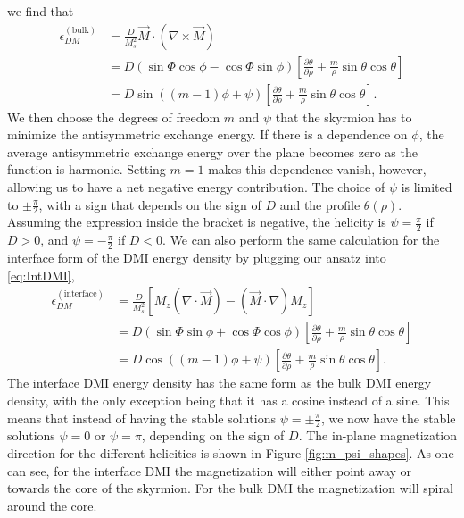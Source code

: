 \documentclass[12pt, a4paper, twoside, openright]{article}		%
\numberwithin{equation}{section}
\begin{document}
we find that
\begin{align}
\nonumber \epsilon_{DM}^{(\text{bulk})} &= \frac{D}{M_s^2} \vec{M}\cdot(\nabla\times\vec{M}) \\
\nonumber &= D\left(\sin\Phi\cos\phi-\cos\Phi\sin\phi\right)\left[\frac{\partial\theta}{\partial\rho}+\frac{m}{\rho}\sin\theta\cos\theta\right] \\
&= D\sin((m-1)\phi+\psi)\left[\frac{\partial\theta}{\partial\rho}+\frac{m}{\rho}\sin\theta\cos\theta\right].\label{eq:BulkDMIepsilon}
\end{align}
We then choose the degrees of freedom $m$ and $\psi$ that the skyrmion has to minimize the antisymmetric exchange energy. If there is a dependence on $\phi$, the average antisymmetric exchange energy over the plane becomes zero as the function is harmonic. Setting $m=1$ makes this dependence vanish, however, allowing us to have a net negative energy contribution. The choice of $\psi$ is limited to $\pm \frac{\pi}{2}$, with a sign that depends on the sign of $D$ and the profile $\theta(\rho)$. Assuming the expression inside the bracket is negative, the helicity is $\psi = \frac{\pi}{2}$ if $D>0$, and $\psi = -\frac{\pi}{2}$ if $D<0$. We can also perform the same calculation for the interface form of the DMI energy density by plugging our ansatz into \eqref{eq:IntDMI},
\begin{align}
\nonumber \epsilon_{DM}^{(\text{interface})} &= \frac{D}{M_s^2}\left[ M_z (\nabla\cdot\vec{M}) - (\vec{M}\cdot\nabla)M_z\right] \\
\nonumber &= D\left(\sin\Phi\sin\phi+\cos\Phi\cos\phi\right)\left[\frac{\partial\theta}{\partial\rho}+\frac{m}{\rho}\sin\theta\cos\theta\right] \\
&= D\cos((m-1)\phi+\psi)\left[\frac{\partial\theta}{\partial\rho}+\frac{m}{\rho}\sin\theta\cos\theta\right].\label{eq:IntDMIepsilon}
\end{align}
The interface DMI energy density has the same form as the bulk DMI energy density, with the only exception being that it has a cosine instead of a sine. This means that instead of having the stable solutions $\psi = \pm \frac{\pi}{2}$, we now have the stable solutions $\psi=0$ or $\psi=\pi$, depending on the sign of $D$. The in-plane magnetization direction for the different helicities is shown in Figure \ref{fig:m_psi_shapes}. As one can see, for the interface DMI the magnetization will either point away or towards the core of the skyrmion. For the bulk DMI the magnetization will spiral around the core.
\end{document}
